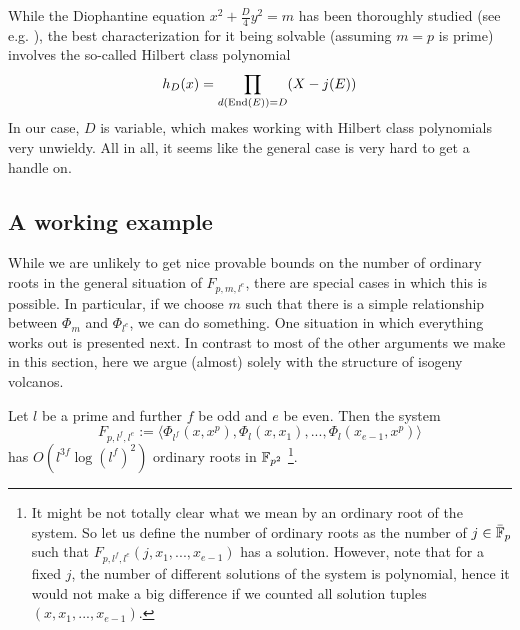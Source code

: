 While the Diophantine equation $x^2 + \frac D 4 y^2 = m$ has been thoroughly studied (see e.g. \cite{cox_primes_of_form}), the best characterization for it being solvable (assuming $m = p$ is prime) involves the so-called Hilbert class polynomial
\begin{equation*}
    h_D(x) = \prod_{d(\mathrm{End}(E)) = D} (X - j(E))
\end{equation*}
In our case, $D$ is variable, which makes working with Hilbert class polynomials very unwieldy.
All in all, it seems like the general case is very hard to get a handle on.

\subsection{A working example}
While we are unlikely to get nice provable bounds on the number of ordinary roots in the general situation of $F_{p, m, l^e}$, there are special cases in which this is possible.
In particular, if we choose $m$ such that there is a simple relationship between $\Phi_m$ and $\Phi_{l^e}$, we can do something.
One situation in which everything works out is presented next.
In contrast to most of the other arguments we make in this section, here we argue (almost) solely with the structure of isogeny volcanos.
\begin{prop}
    Let $l$ be a prime and further $f$ be odd and $e$ be even.
    Then the system
    \begin{equation*}
        F_{p, l^f, l^e} := \langle \Phi_{l^f}(x, x^p), \Phi_l(x, x_1), ..., \Phi_l(x_{e - 1}, x^p) \rangle
    \end{equation*}
    has $O(l^{3f}\log(l^f)^2)$ ordinary roots in $\mathbb{F}_{p^2}$
    \footnote{It might be not totally clear what we mean by an ordinary root of the system.
    So let us define the number of ordinary roots as the number of $j \in \bar{\mathbb{F}}_p$ such that $F_{p, l^f, l^e}(j, x_1, ..., x_{e - 1})$ has a solution.
    However, note that for a fixed $j$, the number of different solutions of the system is polynomial, hence it would not make a big difference if we counted all solution tuples $(x, x_1, ..., x_{e - 1})$.}.
\end{prop}
